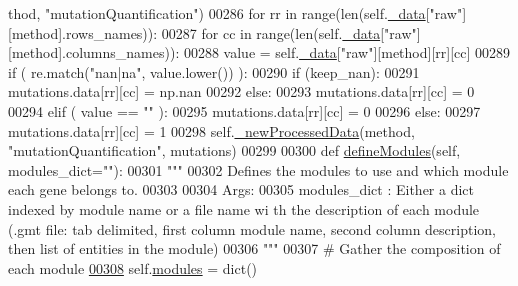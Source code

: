 \begin{DoxyCode}
      thod, \textcolor{stringliteral}{"mutationQuantification"})
00286             \textcolor{keywordflow}{for} rr \textcolor{keywordflow}{in} range(len(self.\hyperlink{classnavicom_1_1navicom_1_1NaviCom_a407b2b5c30a5652ee85c4be54b3e6679}{_data}[\textcolor{stringliteral}{"raw"}][method].rows\_names)):
00287                 \textcolor{keywordflow}{for} cc \textcolor{keywordflow}{in} range(len(self.\hyperlink{classnavicom_1_1navicom_1_1NaviCom_a407b2b5c30a5652ee85c4be54b3e6679}{_data}[\textcolor{stringliteral}{"raw"}][method].columns\_names)):
00288                     value = self.\hyperlink{classnavicom_1_1navicom_1_1NaviCom_a407b2b5c30a5652ee85c4be54b3e6679}{_data}[\textcolor{stringliteral}{"raw"}][method][rr][cc]
00289                     \textcolor{keywordflow}{if} ( re.match(\textcolor{stringliteral}{"nan|na"}, value.lower()) ):
00290                         \textcolor{keywordflow}{if} (keep\_nan):
00291                             mutations.data[rr][cc] = np.nan
00292                         \textcolor{keywordflow}{else}:
00293                             mutations.data[rr][cc] = 0
00294                     \textcolor{keywordflow}{elif} ( value == \textcolor{stringliteral}{""} ):
00295                         mutations.data[rr][cc] = 0
00296                     \textcolor{keywordflow}{else}:
00297                         mutations.data[rr][cc] = 1
00298             self.\hyperlink{classnavicom_1_1navicom_1_1NaviCom_acf8b9094fa76cafefb910daeb68b7e5d}{_newProcessedData}(method, \textcolor{stringliteral}{"mutationQuantification"}, mutations)
00299 
00300     \textcolor{keyword}{def }\hyperlink{classnavicom_1_1navicom_1_1NaviCom_a6411b52971f15bd11270942cb98eaa1a}{defineModules}(self, modules\_dict=""):
00301         \textcolor{stringliteral}{"""}
00302 \textcolor{stringliteral}{        Defines the modules to use and which module each gene belongs to.}
00303 \textcolor{stringliteral}{}
00304 \textcolor{stringliteral}{        Args:}
00305 \textcolor{stringliteral}{            modules\_dict : Either a dict indexed by module name or a file name wi
      th the description of each module (.gmt file: tab delimited, first column module 
      name, second column description, then list of entities in the module)}
00306 \textcolor{stringliteral}{        """}
00307         \textcolor{comment}{# Gather the composition of each module}
\hypertarget{navicom_8py_source_l00308}{}\hyperlink{classnavicom_1_1navicom_1_1NaviCom_a6411b52971f15bd11270942cb98eaa1a}{00308}         self.\hyperlink{classnavicom_1_1navicom_1_1NaviCom_a56141660ddf29a36a8291e938246578c}{modules} = dict()

\end{DoxyCode}
